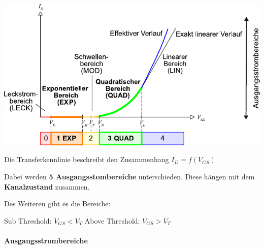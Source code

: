 \begin{minipage}[t]{0.55\columnwidth}
    \includegraphics[width=\columnwidth, align=t]{images/02_MOSFET_transferkennlinie.pdf}
\end{minipage}
\hfill
\begin{minipage}[t]{0.42\columnwidth}
    Die Transferkennlinie beschreibt den Zusammenhang $I_D = f(V_{GS})$ 

    \smallskip

    Dabei werden \textbf{5 Ausgangsstombereiche} unterschieden. Diese hängen mit dem \textbf{Kanalzustand} zusammen.

    \smallskip

    Des Weiteren gibt es die Bereiche:

    \begin{outline}
        \1 Sub Threshold: $V_{GS} < V_T$
        \1 Above Threshold: $V_{GS} > V_T$
    \end{outline}
\end{minipage}


\paragraph{Ausgangsstrombereiche}

